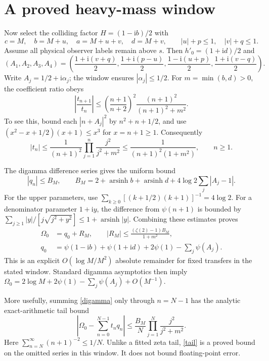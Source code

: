 \documentclass[11pt,a4paper]{article}
\newcommand{\Om}{\Omega}
\newcommand{\ii}{\mathrm i}
\begin{document}
\section{A proved heavy-mass window}
Now select the colliding factor $H=(1-\ii b)/2$ with
\[
 c=M,\quad b=M+u,\quad a=M+u+v,\quad d=M+v,\qquad
 |u|+p\le1,\quad |v|+q\le1.
\]
Assume all physical observer labels remain above $s$.
Then $h'_0=(1+\ii d)/2$ and
\[
 (A_1,A_2,A_3,A_4)=
 \left(\frac{1+\ii(v+q)}2,\frac{1+\ii(p-u)}2,
       \frac{1-\ii(u+p)}2,\frac{1+\ii(v-q)}2\right).
\]
Write $A_j=1/2+\ii\alpha_j$; the window ensures $|\alpha_j|\le1/2$.
For $m=\min(b,d)>0$, the coefficient ratio obeys
\[
 \left|\frac{t_{n+1}}{t_n}\right|
 \le\left(\frac{n+1}{n+2}\right)^2
        \frac{(n+1)^2}{(n+1)^2+m^2}.
\]
To see this, bound each $|n+A_j|^2$ by $n^2+n+1/2$,
and use
$(x^2-x+1/2)(x+1)\le x^3$ for $x=n+1\ge1$.
Consequently
\begin{equation}
 |t_n|\le\frac1{(n+1)^2}
       \prod_{j=1}^n\frac{j^2}{j^2+m^2}
 \le\frac1{(n+1)^2(1+m^2)},\qquad n\ge1. \label{coeffbound}
\end{equation}

The digamma difference series gives the uniform bound
\[
 |q_n|\le B_M,\qquad
 B_M=2+\operatorname{arsinh}b+\operatorname{arsinh}d
             +4\log2\sum_j|A_j-1|.
\]
For the upper parameters, use
$\sum_{k\ge0}[(k+1/2)(k+1)]^{-1}=4\log2$.
For a denominator parameter $1+\ii y$, the difference from $\psi(n+1)$
is bounded by
$\sum_{j\ge1}|y|/[j\sqrt{j^2+y^2}]\le1+\operatorname{arsinh}|y|$.
Combining these estimates proves
\begin{align}
 \Om_0&=q_0+R_M,\qquad
 |R_M|\le\frac{(\zeta(2)-1)B_M}{1+m^2},\label{leading}\\
 q_0&=\psi(1-\ii b)+\psi(1+\ii d)+2\psi(1)-\sum_j\psi(A_j).
\end{align}
This is an explicit $O(\log M/M^2)$ absolute remainder for fixed
transfers in the stated window.
Standard digamma asymptotics then imply
$\Om_0=2\log M+2\psi(1)-\sum_j\psi(A_j)+O(M^{-1})$.

More usefully, summing \eqref{digamma} only through $n=N-1$ has
the analytic exact-arithmetic tail bound
\begin{equation}
 \left|\Om_0-\sum_{n=0}^{N-1}t_nq_n\right|
 \le \frac{B_M}{N}\prod_{j=1}^N\frac{j^2}{j^2+m^2}.
 \label{tail}
\end{equation}
Here $\sum_{n=N}^{\infty}(n+1)^{-2}\le1/N$.
Unlike a fitted zeta tail, \eqref{tail} is a proved bound on the
omitted series in this window. It does not bound floating-point error.
\end{document}
